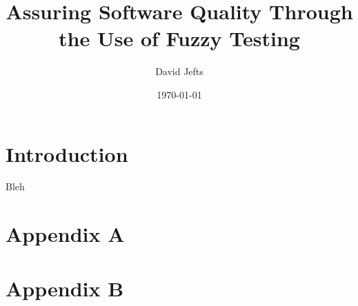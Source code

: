 \documentclass{ieeetran}
\begin{document}
\setcounter{secnumdepth}{-1}


\title{Assuring Software Quality Through the Use of Fuzzy Testing}
\author{David Jefts}
\date{\today}
\begin{titlepage}
	\centering
	\maketitle
	\centering
	\hfill
	\vfill
\end{titlepage}

\setlength{\voffset}{-0.5in}
\setlength{\headsep}{10pt}

\section{Introduction}
	Bleh

\twocolumn


\pagebreak
	
\appendix
	\section{Appendix A}
	
	\pagebreak
	
	\section{Appendix B}
	
\newpage
\nocite{*}


\end{document}
